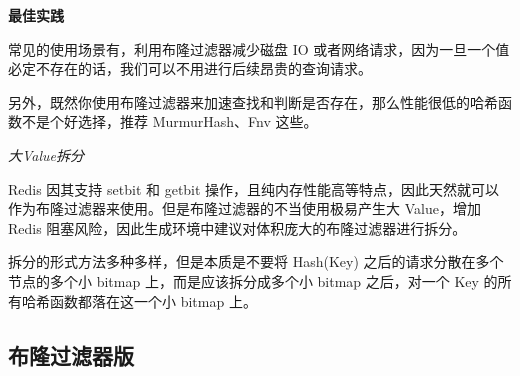 \documentclass[cn,11pt,chinese]{elegantbook}
\begin{document}
\textbf{最佳实践}

常见的使用场景有，利用布隆过滤器减少磁盘 IO 或者网络请求，因为一旦一个值必定不存在的话，我们可以不用进行后续昂贵的查询请求。

另外，既然你使用布隆过滤器来加速查找和判断是否存在，那么性能很低的哈希函数不是个好选择，推荐 MurmurHash、Fnv 这些。

\textit{大Value拆分}

Redis 因其支持 setbit 和 getbit 操作，且纯内存性能高等特点，因此天然就可以作为布隆过滤器来使用。但是布隆过滤器的不当使用极易产生大 Value，增加 Redis 阻塞风险，因此生成环境中建议对体积庞大的布隆过滤器进行拆分。

拆分的形式方法多种多样，但是本质是不要将 Hash(Key) 之后的请求分散在多个节点的多个小 bitmap 上，而是应该拆分成多个小 bitmap 之后，对一个 Key 的所有哈希函数都落在这一个小 bitmap 上。

\subsection{布隆过滤器版}
\end{document}
